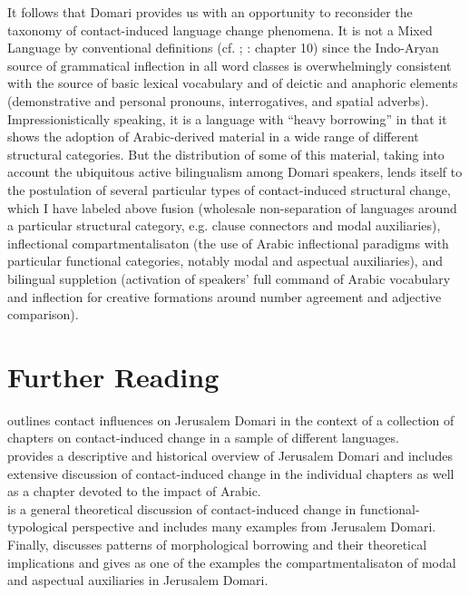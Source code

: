 \documentclass[output=paper]{langsci/langscibook}
\begin{document}
It follows that Domari provides us with an opportunity to reconsider the taxonomy of contact-induced language change phenomena. It is not a Mixed Language by conventional definitions (cf. \citealt{BakkerMatras2013}; \citealt{Matras2009}: chapter 10) since the Indo-Aryan source of grammatical inflection in all word classes is overwhelmingly consistent with the source of basic lexical vocabulary and of deictic and anaphoric elements (demonstrative and personal pronouns, interrogatives, and spatial adverbs). Impressionistically speaking, it is a language with ``heavy borrowing'' in that it shows the adoption of Arabic-derived material in a wide range of different structural categories. But the distribution of some of this material, taking into account the ubiquitous active bilingualism among Domari speakers,  lends itself to the postulation of several particular types of contact-induced structural change, which I have labeled above fusion (wholesale non-separation of languages around a particular structural category, e.g. clause connectors and modal auxiliaries), inflectional compartmentalisaton (the use of Arabic inflectional paradigms with particular functional categories, notably modal and aspectual auxiliaries), and bilingual suppletion (activation of speakers’ full command of Arabic vocabulary and inflection for creative formations around number agreement and adjective comparison).

\section{
Further Reading
}

\citet{Matras2007Domari} outlines contact influences on Jerusalem Domari in the context of a collection of chapters on contact-induced change in a sample of different languages.\\ \citet{Matras2012} provides a descriptive and historical overview of Jerusalem Domari and includes extensive discussion of contact-induced change in the individual chapters as well as a chapter devoted to the impact of Arabic.\\ \citet{Matras2009} is a general theoretical discussion of contact-induced change in functional-typological perspective and includes many examples from Jerusalem Domari.\\ Finally, \citet{Matras2015} discusses patterns of morphological borrowing and their theoretical implications and gives as one of the examples the compartmentalisaton of modal and aspectual auxiliaries in Jerusalem Domari. 
\end{document}
